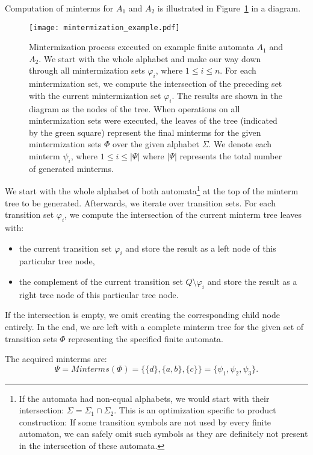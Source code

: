 Computation of minterms for $A_1$ and $A_2$ is illustrated in Figure~\ref{fig:diagram:mintermization_example} in a diagram.

\begin{figure}[ht]
	\centering
	\texttt{[image: mintermization\_example.pdf]}
	\caption{Mintermization process executed on example finite automata $A_1$ and $A_2$. We start with the whole alphabet and make our way down through all mintermization sets $\varphi_i$, where $1 \leq i \leq n$. For each mintermization set, we compute the intersection of the preceding set with the current mintermization set $\varphi_i$. The results are shown in the diagram as the nodes of the tree. When operations on all mintermization sets were executed, the leaves of the tree (indicated by the green square) represent the final minterms for the given mintermization sets $\Phi$ over the given alphabet $\Sigma$. We denote each minterm $\psi_i$, where $1 \leq i \leq |\Psi|$ where $|\Psi|$ represents the total number of generated minterms.}
	\label{fig:diagram:mintermization_example}
\end{figure}

We start with the whole alphabet of both automata\footnote{If the automata had non-equal alphabets, we would start with their intersection: $\Sigma = \Sigma_1 \cap \Sigma_2$. This is an optimization specific to product construction: If some transition symbols are not used by every finite automaton, we can safely omit such symbols as they are definitely not present in the intersection of these automata.} at the top of the minterm tree to be generated. Afterwards, we iterate over transition sets. For each transition set $\varphi_i$, we compute the intersection of the current minterm tree leaves with:
\begin{itemize}
    \item the current transition set $\varphi_i$ and store the result as a left node of this particular tree node,
    \item the complement of the current transition set $Q \setminus \varphi_i$ and store the result as a right tree node of this particular tree node.
\end{itemize}

If the intersection is empty, we omit creating the corresponding child node entirely. In the end, we are left with a complete minterm tree for the given set of transition sets $\Phi$ representing the specified finite automata.


The acquired minterms are:
$$ \Psi = Minterms(\Phi) = \bigl\{ \{d\}, \{a, b\}, \{c\} \bigr\} = \{ \psi_1, \psi_2, \psi_3 \} \text{.}$$

